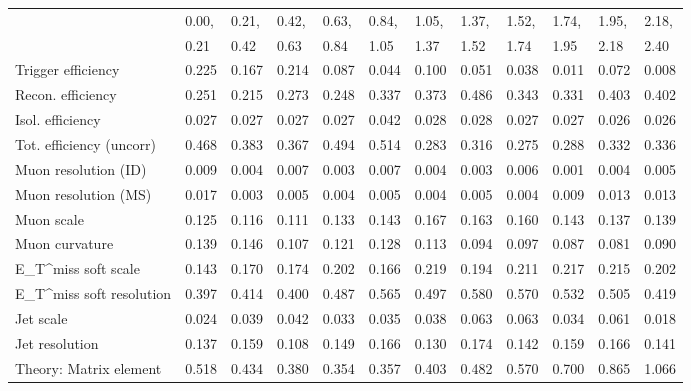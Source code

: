 \begin{tabular}{l|p{0.6cm}p{0.6cm}p{0.6cm}p{0.6cm}p{0.6cm}p{0.6cm}p{0.6cm}p{0.6cm}p{0.6cm}p{0.6cm}p{0.6cm}}
\hline
   & 0.00, & 0.21, & 0.42, & 0.63, & 0.84, & 1.05, & 1.37, & 1.52, & 1.74, & 1.95, & 2.18,  \\ 
   & 0.21 & 0.42 & 0.63 & 0.84 & 1.05 & 1.37 & 1.52 & 1.74 & 1.95 & 2.18 & 2.40  \\ 
\hline
Trigger efficiency                       & 0.225 & 0.167 & 0.214 & 0.087 & 0.044 & 0.100 & 0.051 & 0.038 & 0.011 & 0.072 & 0.008 \\
Recon. efficiency                        & 0.251 & 0.215 & 0.273 & 0.248 & 0.337 & 0.373 & 0.486 & 0.343 & 0.331 & 0.403 & 0.402 \\
Isol. efficiency                         & 0.027 & 0.027 & 0.027 & 0.027 & 0.042 & 0.028 & 0.028 & 0.027 & 0.027 & 0.026 & 0.026 \\
Tot. efficiency (uncorr)                 & 0.468 & 0.383 & 0.367 & 0.494 & 0.514 & 0.283 & 0.316 & 0.275 & 0.288 & 0.332 & 0.336 \\
Muon resolution (ID)                     & 0.009 & 0.004 & 0.007 & 0.003 & 0.007 & 0.004 & 0.003 & 0.006 & 0.001 & 0.004 & 0.005 \\
Muon resolution (MS)                     & 0.017 & 0.003 & 0.005 & 0.004 & 0.005 & 0.004 & 0.005 & 0.004 & 0.009 & 0.013 & 0.013 \\
Muon scale                               & 0.125 & 0.116 & 0.111 & 0.133 & 0.143 & 0.167 & 0.163 & 0.160 & 0.143 & 0.137 & 0.139 \\
Muon curvature                           & 0.139 & 0.146 & 0.107 & 0.121 & 0.128 & 0.113 & 0.094 & 0.097 & 0.087 & 0.081 & 0.090 \\
E_{T}^{miss} soft scale                  & 0.143 & 0.170 & 0.174 & 0.202 & 0.166 & 0.219 & 0.194 & 0.211 & 0.217 & 0.215 & 0.202 \\
E_{T}^{miss} soft resolution             & 0.397 & 0.414 & 0.400 & 0.487 & 0.565 & 0.497 & 0.580 & 0.570 & 0.532 & 0.505 & 0.419 \\
Jet scale                                & 0.024 & 0.039 & 0.042 & 0.033 & 0.035 & 0.038 & 0.063 & 0.063 & 0.034 & 0.061 & 0.018 \\
Jet resolution                           & 0.137 & 0.159 & 0.108 & 0.149 & 0.166 & 0.130 & 0.174 & 0.142 & 0.159 & 0.166 & 0.141 \\
Theory: Matrix element                   & 0.518 & 0.434 & 0.380 & 0.354 & 0.357 & 0.403 & 0.482 & 0.570 & 0.700 & 0.865 & 1.066 \\

\end{tabular}

